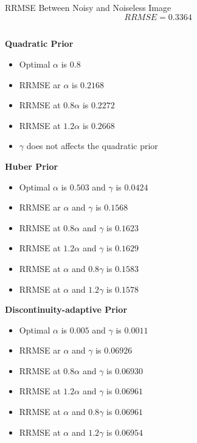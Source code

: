\documentclass[11pt]{article}
\begin{document}
\maketitle

\subsection{}
RRMSE Between Noisy and Noiseless Image 
$$RRMSE = 0.3364$$

\subsection{}
\hfill \break
\textbf{Quadratic Prior}
\begin{itemize}
	\item Optimal $\alpha$ is $0.8$
	\item RRMSE ar $\alpha$ is $0.2168$
	\item RRMSE at $0.8\alpha$ is $0.2272$
	\item RRMSE at $1.2\alpha$ is $0.2668$
	\item $\gamma$ does not affects the quadratic prior
\end{itemize}

\hfill \break
\textbf{Huber Prior}
\begin{itemize}
	\item Optimal $\alpha$ is $0.503$ and $\gamma$ is $0.0424$ 
	\item RRMSE ar $\alpha$ and $\gamma$ is $0.1568$
	\item RRMSE at $0.8\alpha$ and $\gamma$ is $0.1623$
	\item RRMSE at $1.2\alpha$ and $\gamma$ is $0.1629$
	\item RRMSE at $\alpha$ and $0.8\gamma$ is $0.1583$
	\item RRMSE at $\alpha$ and $1.2\gamma$ is $0.1578$
\end{itemize}

\hfill \break
\textbf{Discontinuity-adaptive Prior}
\begin{itemize}
	\item Optimal $\alpha$ is $0.005$ and $\gamma$ is $0.0011$ 
	\item RRMSE ar $\alpha$ and $\gamma$ is $0.06926$
	\item RRMSE at $0.8\alpha$ and $\gamma$ is $0.06930$
	\item RRMSE at $1.2\alpha$ and $\gamma$ is $0.06961$
	\item RRMSE at $\alpha$ and $0.8\gamma$ is $0.06961$
	\item RRMSE at $\alpha$ and $1.2\gamma$ is $0.06954$
\end{itemize}
\end{document}
